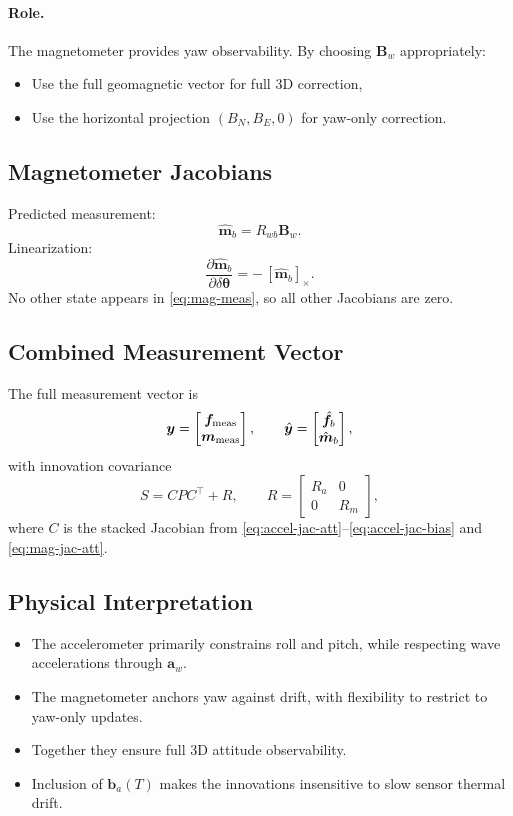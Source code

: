 \documentclass[10pt]{extarticle}
\begin{document}
\paragraph{Role.}
The magnetometer provides yaw observability. By choosing $\bm B_w$ appropriately:
\begin{itemize}
\item Use the full geomagnetic vector for full 3D correction,
\item Use the horizontal projection $(B_N,B_E,0)$ for yaw-only correction.
\end{itemize}

\subsection{Magnetometer Jacobians}
Predicted measurement:
\[
\hat{\bm m}_b = R_{wb}\bm B_w.
\]
Linearization:
\begin{equation}
\frac{\partial \hat{\bm m}_b}{\partial \delta\bm\theta} = -\,[\hat{\bm m}_b]_\times.
\label{eq:mag-jac-att}
\end{equation}
No other state appears in \eqref{eq:mag-meas}, so all other Jacobians are zero.

\subsection{Combined Measurement Vector}
The full measurement vector is
\[
\bm y = \begin{bmatrix}\bm f_{\rm meas}\\ \bm m_{\rm meas}\end{bmatrix},
\qquad
\hat{\bm y} = \begin{bmatrix}\hat{\bm f}_b\\ \hat{\bm m}_b\end{bmatrix},
\]
with innovation covariance
\begin{equation}
S = C P C^\top + R,
\qquad
R = \begin{bmatrix} R_a & 0 \\ 0 & R_m \end{bmatrix},
\label{eq:meas-cov}
\end{equation}
where $C$ is the stacked Jacobian from \eqref{eq:accel-jac-att}--\eqref{eq:accel-jac-bias} and \eqref{eq:mag-jac-att}.

\subsection{Physical Interpretation}
\begin{itemize}
\item The accelerometer primarily constrains roll and pitch, while respecting wave accelerations
through $\bm a_w$.
\item The magnetometer anchors yaw against drift, with flexibility to restrict to yaw-only updates.
\item Together they ensure full 3D attitude observability.
\item Inclusion of $\bm b_a(T)$ makes the innovations insensitive to slow sensor thermal drift.
\end{itemize}
\end{document}

